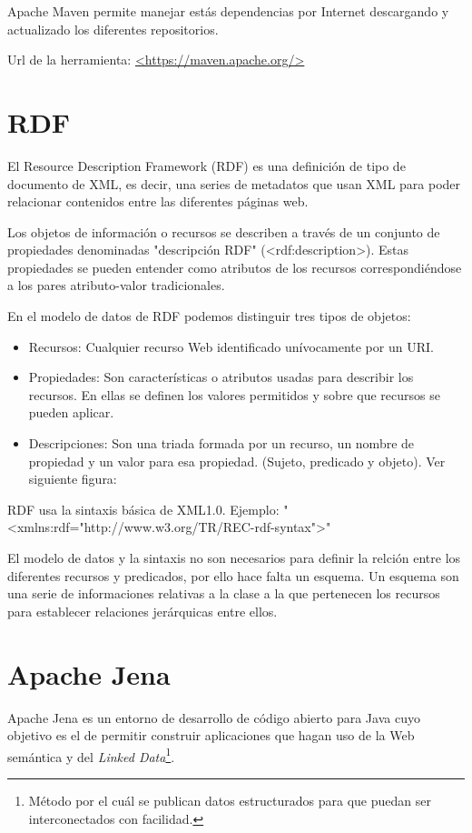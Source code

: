 Apache Maven permite manejar estás dependencias por Internet descargando y actualizado los diferentes repositorios.\cite{wiki:maven}

Url de la herramienta: \url{<https://maven.apache.org/>}

\section{RDF}

El Resource Description Framework (RDF) es una definición de tipo de documento de XML, es decir, una series de metadatos que usan XML para poder relacionar contenidos entre las diferentes páginas web.

Los objetos de información o recursos se describen a través de un conjunto de propiedades denominadas "descripción RDF" (<rdf:description>). Estas propiedades se pueden entender como atributos de los recursos correspondiéndose a los pares atributo-valor tradicionales.

En el modelo de datos de RDF podemos distinguir tres tipos de objetos:

\begin{itemize}
	\item{Recursos}: Cualquier recurso Web identificado unívocamente por un URI.
	\item{Propiedades}: Son características o atributos usadas para describir los recursos. En ellas se definen los valores permitidos y sobre que recursos se pueden aplicar.
	\item{Descripciones}: Son una triada formada por un recurso, un nombre de propiedad y un valor para esa propiedad. (Sujeto, predicado y objeto).
Ver siguiente figura:
\end{itemize}

RDF usa la sintaxis básica de XML1.0. Ejemplo: "<xmlns:rdf="http://www.w3.org/TR/REC-rdf-syntax">"

El modelo de datos y la sintaxis no son necesarios para definir la relción entre los diferentes recursos y predicados, por ello hace falta un esquema.
Un esquema son una serie de informaciones relativas a la clase a la que pertenecen los recursos para establecer relaciones jerárquicas entre ellos.

\section{Apache Jena}

Apache Jena es un entorno de desarrollo de código abierto para Java cuyo objetivo es el de permitir construir aplicaciones que hagan uso de la Web semántica y del \textit{Linked Data}\footnote{Método por el cuál se publican datos estructurados para que puedan ser interconectados con facilidad.}. 

